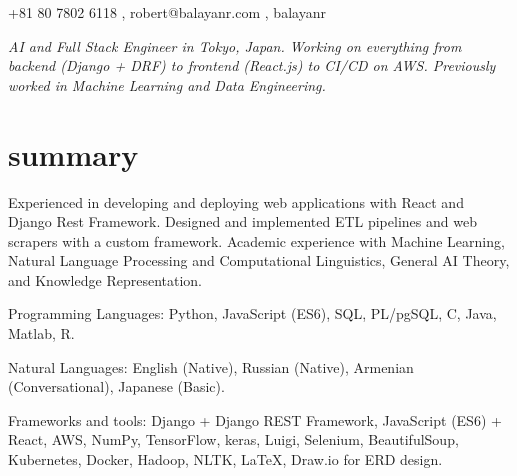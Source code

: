 \documentclass[]{cv-roald}
\begin{document}
\pagestyle{empty} %

{
\faMobile \hspace{\FAspace} +81 80 7802 6118 \sep 
\href{mailto:robert@balayanr.com}{\faEnvelope} \hspace{\FAspace} \faSkype\hspace{\FAspace} robert@balayanr.com \sep 
\href{https://www.linkedin.com/in/balayanr/}{\faLinkedinSquare} \hspace{\FAspace} \href{https://github.com/balayanr}{\faGithub} \hspace{\FAspace} balayanr \FAspace  %
}


\textit{AI and Full Stack Engineer in Tokyo, Japan. Working on everything from backend (Django + DRF) to frontend (React.js) to CI/CD on AWS. Previously worked in Machine Learning and Data Engineering.}

\section*{summary}
\begin{tabitemize}
    \item Experienced in developing and deploying web applications with React and Django Rest Framework. Designed and implemented ETL pipelines and web scrapers with a custom framework. Academic experience with Machine Learning, Natural Language Processing and Computational Linguistics, General AI Theory, and Knowledge Representation.
    \item Programming Languages: Python, JavaScript (ES6), SQL, PL/pgSQL, C, Java, Matlab, R.
    \item Natural Languages: English (Native), Russian (Native), Armenian (Conversational), Japanese (Basic).
    \item Frameworks and tools: Django + Django REST Framework, JavaScript (ES6) + React, AWS, NumPy, TensorFlow, keras, Luigi, Selenium, BeautifulSoup, Kubernetes, Docker, Hadoop, NLTK, \LaTeX, Draw.io for ERD design.
\end{tabitemize}
\end{document}
